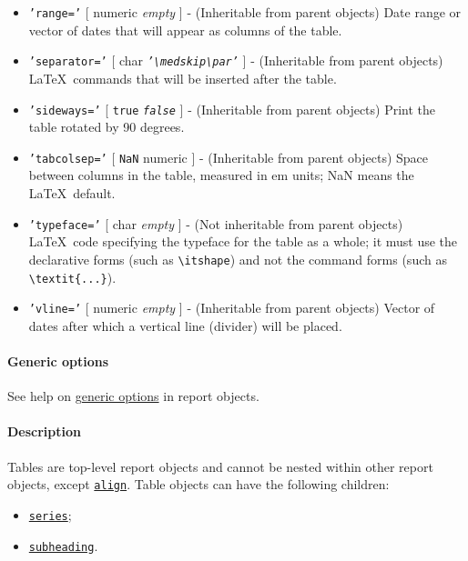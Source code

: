 \begin{itemize}
 \item
   \texttt{'range='} {[} numeric \textbar{} \emph{empty} {]} -
   (Inheritable from parent objects) Date range or vector of dates that
   will appear as columns of the table.
 \item
   \texttt{'separator='} {[} char \textbar{}
   \emph{\texttt{'\textbackslash{}medskip\textbackslash{}par'}} {]} -
   (Inheritable from parent objects) \LaTeX~commands that will be
   inserted after the table.
 \item
   \texttt{'sideways='} {[} \texttt{true} \textbar{}
   \emph{\texttt{false}} {]} - (Inheritable from parent objects) Print
   the table rotated by 90 degrees.
 \item
   \texttt{'tabcolsep='} {[} \texttt{NaN} \textbar{} numeric {]} -
   (Inheritable from parent objects) Space between columns in the table,
   measured in em units; NaN means the \LaTeX~default.
 \item
   \texttt{'typeface='} {[} char \textbar{} \emph{empty} {]} - (Not
   inheritable from parent objects) \LaTeX~code specifying the typeface
   for the table as a whole; it must use the declarative forms (such as
   \texttt{\textbackslash{}itshape}) and not the command forms (such as
   \texttt{\textbackslash{}textit\{...\}}).
 \item
   \texttt{'vline='} {[} numeric \textbar{} \emph{empty} {]} -
   (Inheritable from parent objects) Vector of dates after which a
   vertical line (divider) will be placed.
 \end{itemize}
 
 \paragraph{Generic options}
 
 See help on \href{report/Contents}{generic options} in report objects.
 
 \paragraph{Description}
 
 Tables are top-level report objects and cannot be nested within other
 report objects, except \href{report/align}{\texttt{align}}. Table
 objects can have the following children:
 
 \begin{itemize}
 \item
   \href{report/series}{\texttt{series}};
 \item
   \href{report/subheading}{\texttt{subheading}}.
 \end{itemize}
 
